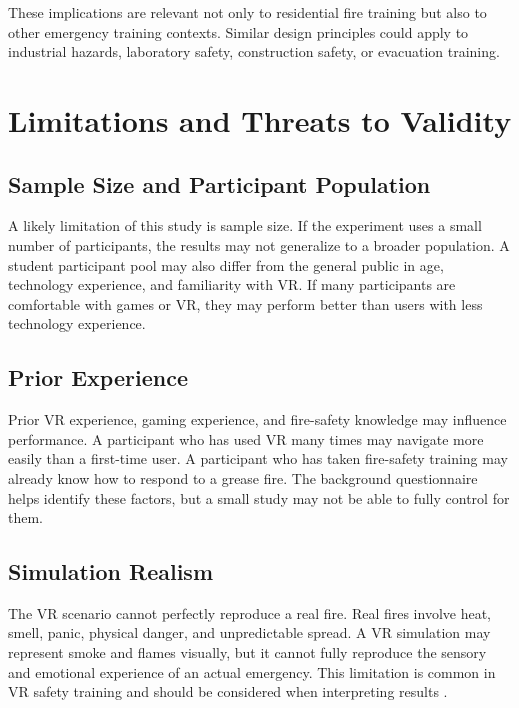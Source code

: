 \documentclass[manuscript, review]{acmart}
\begin{document}
{These implications are relevant not only to residential fire training but also to other emergency training contexts. Similar design principles could apply to industrial hazards, laboratory safety, construction safety, or evacuation training.

\section{Limitations and Threats to Validity}
\label{sec:limitations}

\subsection{Sample Size and Participant Population}

A likely limitation of this study is sample size. If the experiment uses a small number of participants, the results may not generalize to a broader population. A student participant pool may also differ from the general public in age, technology experience, and familiarity with VR. If many participants are comfortable with games or VR, they may perform better than users with less technology experience.

\subsection{Prior Experience}

Prior VR experience, gaming experience, and fire-safety knowledge may influence performance. A participant who has used VR many times may navigate more easily than a first-time user. A participant who has taken fire-safety training may already know how to respond to a grease fire. The background questionnaire helps identify these factors, but a small study may not be able to fully control for them.

\subsection{Simulation Realism}

The VR scenario cannot perfectly reproduce a real fire. Real fires involve heat, smell, panic, physical danger, and unpredictable spread. A VR simulation may represent smoke and flames visually, but it cannot fully reproduce the sensory and emotional experience of an actual emergency. This limitation is common in VR safety training and should be considered when interpreting results \cite{khan2023smell,huang2025building}.

}
\end{document}
